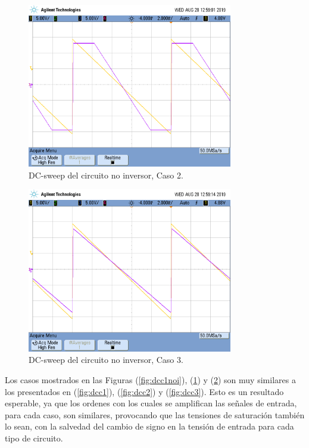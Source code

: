 \begin{figure}[H]	
	\centering
	\includegraphics[width=0.8\textwidth, trim = {0 3.3cm 0 2cm},clip]{Ejercicio1/Imagenes/dc_sweep_c2_noinv.png}
	\caption{DC-sweep del circuito no inversor, Caso 2.}
	\label{fig:dcc2noi}
\end{figure} 

\begin{figure}[H]	
	\centering
	\includegraphics[width=0.8\textwidth, trim = {0 3.3cm 0 2cm},clip]{Ejercicio1/Imagenes/dc_sweep_c3_noinv.png}
	\caption{DC-sweep del circuito no inversor, Caso 3.}
	\label{fig:dcc3noi}
\end{figure} 

Los casos mostrados en las Figuras (\ref{fig:dcc1noi}), (\ref{fig:dcc2noi}) y (\ref{fig:dcc3noi}) son muy similares a los presentados en (\ref{fig:dcc1}), (\ref{fig:dcc2}) y (\ref{fig:dcc3}). Esto es un resultado esperable, ya que los ordenes con los cuales se amplifican las señales de entrada, para cada caso, son similares, provocando que las tensiones de saturación también lo sean, con la salvedad del cambio de signo en la tensión de entrada para cada tipo de circuito.

